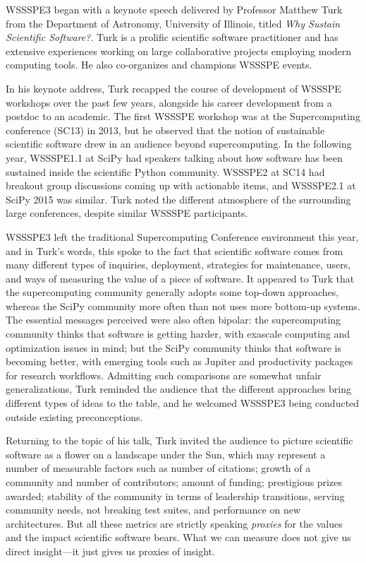 \documentclass[11pt, oneside]{amsart}
\begin{document}
WSSSPE3 began with a keynote speech delivered by Professor Matthew Turk from the
Department of Astronomy, University of Illinois, titled \emph{Why Sustain
Scientific Software?}. Turk is a prolific scientific software practitioner and
has extensive experiences working on large collaborative projects employing
modern computing tools. He also co-organizes and champions WSSSPE events.

In his keynote address, Turk recapped the course of development of WSSSPE
workshops over the past few years, alongside his career development from a
postdoc to an academic. The first WSSSPE workshop was at the Supercomputing
conference (SC13) in 2013, but he observed that the notion of sustainable
scientific software drew in an audience beyond supercomputing. In the following
year, WSSSPE1.1 at SciPy had speakers talking about how software has been
sustained inside the scientific Python community. WSSSPE2 at SC14 had breakout
group discussions coming up with actionable items, and WSSSPE2.1 at SciPy 2015
was similar. Turk noted the different atmosphere of the surrounding large
conferences, despite similar WSSSPE participants.

WSSSPE3 left the traditional Supercomputing Conference environment this year,
and in Turk's words, this spoke to the fact that scientific software comes from
many different types of inquiries, deployment, strategies for maintenance,
users, and ways of measuring the value of a piece of software. It appeared to
Turk that the supercomputing community generally adopts some top-down
approaches, whereas the SciPy community more often than not uses more bottom-up
systems. The essential messages perceived were also often bipolar: the
supercomputing community thinks that software is getting harder, with exascale
computing and optimization issues in mind; but the SciPy community thinks that
software is becoming better, with emerging tools such as Jupiter and
productivity packages for research workflows. Admitting such comparisons are
somewhat unfair generalizations, Turk reminded the audience that the different
approaches bring different types of ideas to the table, and he welcomed WSSSPE3
being conducted outside existing preconceptions.

Returning to the topic of his talk, Turk invited the audience to picture
scientific software as a flower on a landscape under the Sun, which may
represent a number of measurable factors such as number of citations; growth of
a community and number of contributors; amount of funding; prestigious prizes
awarded; stability of the community in terms of leadership transitions, serving
community needs, not breaking test suites, and performance on new architectures.
But all these metrics are strictly speaking \emph{proxies} for the values and
the impact scientific software bears. What we can measure does not give us
direct insight---it just gives us proxies of insight.
  
\end{document}
